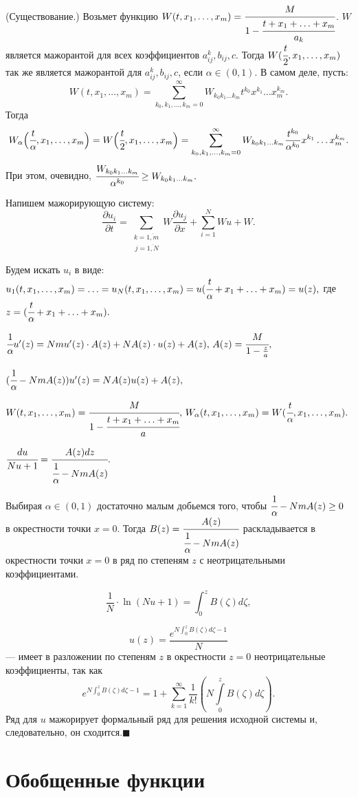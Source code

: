 \documentclass[12pt,a4paper,draft]{article}
\DeclareRobustCommand*{\т}{~--- }
\DeclareRobustCommand*{\ч}{~-- }
\begin{document}
(Существование.) Возьмет функцию $W(t,x_1,\ldots,x_m)=\cfrac
M{1-\cfrac{t+x_1+\ldots+x_m}{a_k}}$. $W$ является мажорантой для
всех коэффициентов $a_{ij}^k,b_{ij},c.$ Тогда $W(\cfrac
t2,x_1,\ldots,x_m)$ так же является мажорантой для
$a_{ij}^k,b_{ij},c$, если $\alpha \in (0,1).$ В самом деле, пусть:
$$W(t,x_1,\ldots,x_m)=\sum_{k_0,k_1,\ldots,k_m=0}^{\infty}W_{k_0 k_1\ldots k_m}t^{k_0}x^{k_1}\ldots x_m^{k_m}.$$
Тогда $$W_{\alpha}\Bigl(\cfrac t
{\alpha},x_1,\ldots,x_m\Bigr)=W\Bigl(\cfrac
t2,x_1,\ldots,x_m\Bigr)=\sum_{k_0,k_1,\ldots,k_m=0}^{\infty}W_{k_0
k_1\ldots k_m}\frac {t^{k_0}}{\alpha^{k_0}}x^{k_1}\ldots
x_m^{k_m}.$$ При этом, очевидно, $\cfrac {W_{k_0 k_1\ldots
k_m}}{\alpha^{k_0}}\ge W_{k_0 k_1\ldots k_m}.$

Напишем мажорирующую систему:
$$\frac{\partial u_i}{\partial t}=
\sum_{\substack{k=\overline {1,m}\\\,j=\overline {1,N}}}W
\frac{\partial u_j}{\partial x}+\sum_{i=1}^N W u+W.$$

Будем искать $u_i$ в виде:
$u_1(t,x_1,\ldots,x_m)=\ldots=u_N(t,x_1,\ldots,x_m)=u(\cfrac t
{\alpha}+x_1+\ldots+x_m)=u(z),$ где $z=(\cfrac t
{\alpha}+x_1+\ldots+x_m).$

$\cfrac1{\alpha}u'(z)=N m u'(z)\cdot A(z)+N A(z) \cdot u(z)+A(z),
\, A(z)=\cfrac M{1-\frac za},$

$(\cfrac1{\alpha}-N m A(z))u'(z)=N A(z) u(z)+A(z),$

$W(t,x_1,\ldots,x_m)=\cfrac M{1-\cfrac{t+x_1+\ldots+x_m}a},\,
W_{\alpha}(t,x_1,\ldots,x_m)=W(\cfrac t {\alpha},x_1,\ldots,x_m).$

$\cfrac {du}{Nu+1}=\cfrac {A(z)dz}{\cfrac1{\alpha}-N m A(z)}.$

Выбирая $\alpha \in (0,1)$ достаточно малым добьемся того, чтобы
$\cfrac1{\alpha}-N m A(z)\ge0$ в окрестности точки $x=0$. Тогда
$B(z)=\cfrac {A(z)}{\cfrac1{\alpha}-N m A(z)}$ раскладывается в
окрестности точки $x=0$ в ряд по степеням $z$ с неотрицательными
коэффициентами.

$$\frac1N\cdot \ln(Nu+1)=\int_0^zB(\zeta) d\zeta,$$

$$u(z)=\frac{e^{N\int_0^zB(\zeta) d\zeta-1}}N$$ --- имеет в
разложении по степеням $z$ в окрестности $z=0$ неотрицательные
коэффициенты, так как $$e^{N\int_0^zB(\zeta)
d\zeta-1}=1+\sum_{k=1}^{\infty}\frac1{k!}(N\int\limits_0^zB(\zeta)
d\zeta).$$ Ряд для $u$ мажорирует формальный ряд для решения
исходной системы и, следовательно, он сходится.$\blacksquare$


\section{Обобщенные функции}
\end{document}
